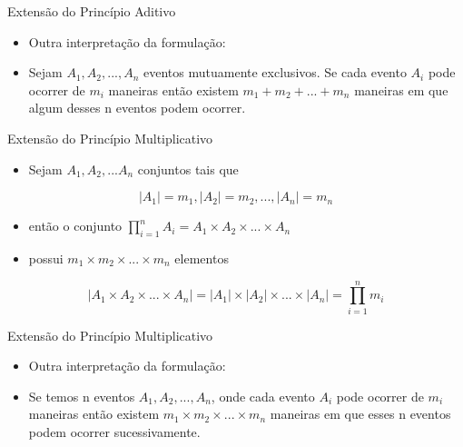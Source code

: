 \documentclass[aspectratio=169]{beamer}
\begin{document}
\begin{frame}{Extensão do Princípio Aditivo}
\begin{itemize}
    \item Outra interpretação da formulação:
    \item[] Sejam $A_1, A_2, ..., A_n$ eventos mutuamente exclusivos. Se cada evento $A_i$ pode ocorrer de $m_i$ maneiras então existem $m_1 + m_2 + ... + m_n$ maneiras em que algum desses n eventos podem ocorrer.
\end{itemize}
\end{frame}

\begin{frame}{Extensão do Princípio Multiplicativo}
    \begin{itemize}
        \item Sejam $A_1, A_2, ... A_n$ conjuntos tais que
    \end{itemize}
    
    $$ |A_1| = m_1, |A_2| = m_2, ..., |A_n| = m_n$$
    
    \vspace{4mm}
    
    \begin{itemize}
        \item[] então o conjunto $\prod_{i = 1}^{n} A_i = A_1 \times A_2 \times ... \times A_n$
        \item[] possui $m_1 \times m_2 \times ... \times m_n$ elementos
    \end{itemize}
    
    $$ |A_1 \times A_2 \times ... \times A_n| = |A_1| \times |A_2| \times ... \times |A_n| = \prod_{i=1}^{n} m_i$$
    \end{frame}

\begin{frame}{Extensão do Princípio Multiplicativo}
    \begin{itemize}
        \item Outra interpretação da formulação:
        \item[] Se temos n eventos $A_1, A_2, ..., A_n$, onde cada evento $A_i$ pode ocorrer de $m_i$ maneiras então existem $m_1 \times m_2 \times ... \times m_n$ maneiras em que esses n eventos podem ocorrer sucessivamente.
    \end{itemize}
    \end{frame}
\end{document}
